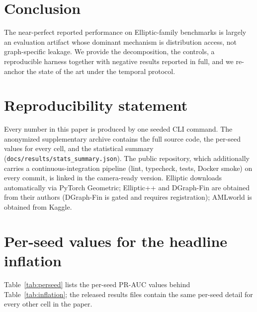 \documentclass{article}
\begin{document}
\section{Conclusion}
The near-perfect reported performance on Elliptic-family benchmarks is largely an
evaluation artifact whose dominant mechanism is distribution access, not
graph-specific leakage. We provide the decomposition, the controls, a reproducible
harness together with negative results reported in full, and we re-anchor the
state of the art under the temporal protocol.

\section*{Reproducibility statement}
Every number in this paper is produced by one seeded CLI command. The anonymized
supplementary archive contains the full source code, the per-seed values for
every cell, and the statistical summary
(\texttt{docs/results/stats\_summary.json}). The public repository, which
additionally carries a continuous-integration pipeline (lint, typecheck, tests,
Docker smoke) on every commit, is linked in the camera-ready version. Elliptic
downloads automatically via PyTorch Geometric; Elliptic++ and DGraph-Fin are
obtained from their authors (DGraph-Fin is gated and requires registration);
AMLworld is obtained from Kaggle.




\appendix

\section{Per-seed values for the headline inflation}
\label{app:perseed}
Table~\ref{tab:perseed} lists the per-seed PR-AUC values behind
Table~\ref{tab:inflation}; the released results files contain the same
per-seed detail for every other cell in the paper.
\end{document}
